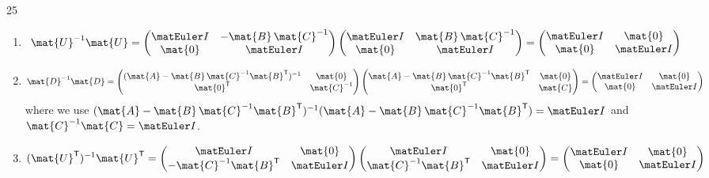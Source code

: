 \documentclass{sotonExamBoxes}    %
\begin{document}
\begin{question}{25}
\begin{qparts}
{\begin{answer}
    \begin{enumerate}
      \item
        \begin{align*}
          \mat{U}^{-1}\mat{U} = \begin{pmatrix} \Id &
            -\mat{B}\,\mat{C}^{-1} \\ \mat{0} &
            \Id \end{pmatrix} \begin{pmatrix} \Id &
            \mat{B}\,\mat{C}^{-1}\\ \mat{0} & \Id \end{pmatrix}
          = \begin{pmatrix} \Id & \mat{0} \\ \mat{0} &
            \Id \end{pmatrix} 
        \end{align*}
      \item
        \begin{align*}
          \mat{D}^{-1}\mat{D} =  \begin{pmatrix} (\mat{A}-
           \mat{B}\,\mat{C}^{-1}\mat{B}^{\tr})^{-1} & \mat{0}\\
           \mat{0}^{\tr} & \mat{C}^{-1} \end{pmatrix} \begin{pmatrix} \mat{A}-
           \mat{B}\,\mat{C}^{-1}\mat{B}^{\tr}
           & \mat{0}\\ \mat{0}^{\tr} &
           \mat{C}  \end{pmatrix}= \begin{pmatrix} \Id & \mat{0}
           \\ \mat{0} &  \Id \end{pmatrix}                                                                                   
        \end{align*}
        where we use $(\mat{A}-
           \mat{B}\,\mat{C}^{-1}\mat{B}^{\tr})^{-1}(\mat{A}-
           \mat{B}\,\mat{C}^{-1}\mat{B}^{\tr}) = \Id$ and
           $\mat{C}^{-1}\mat{C}=\Id$.
         \item
           \begin{align*}
              (\mat{U}^\tr)^{-1}\mat{U}^\tr =
           \begin{pmatrix} \Id &
        \mat{0} \\ -\mat{C}^{-1} \mat{B}^\tr & \Id \end{pmatrix} 
         \begin{pmatrix} \Id & \mat{0}\\ 
           \mat{C}^{-1}\mat{B}^{\tr} & \Id \end{pmatrix}
                                       =          \begin{pmatrix} \Id & \mat{0}
           \\ \mat{0} &  \Id \end{pmatrix}                                             
           \end{align*}
         \end{enumerate}
       \end{answer}
}{}
       \clearpage
       

\end{qparts}
\end{question}
\end{document}
